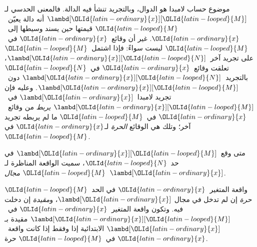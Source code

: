 \documentclass[../../../include/open-logic-section]{subfiles}
\begin{document}

موضوع حساب لامبدا هو الدوال، وبالتجريد تنشأ فيه الدالة.
فالمعنى الحدسي لـ$\lambd[\OLId{latin-ordinary}{x}][\OLId{latin-looped}{M}]$ أنه دالة يعيّن~$\OLId{latin-looped}{M}$ قيمتها حين يسند وسيطها إلى~$\OLId{latin-ordinary}{x}$.
غير أن وقائع~$\OLId{latin-ordinary}{x}$ في~$\OLId{latin-looped}{M}$ ليست سواءً: فإذا اشتمل~$\OLId{latin-looped}{M}$ على تجريد آخر~$\lambd[\OLId{latin-ordinary}{x}][\OLId{latin-looped}{N}]$،
تعلقت وقائع~$\OLId{latin-ordinary}{x}$ في~$\OLId{latin-looped}{N}$ بالتجريد~$\lambd[\OLId{latin-ordinary}{x}][\OLId{latin-looped}{N}]$ دون~$\lambd[\OLId{latin-ordinary}{x}][\OLId{latin-looped}{M}]$.
وعليه فإن تجريد لامبدا~$\lambd[\OLId{latin-ordinary}{x}]$ في~$\lambd[\OLId{latin-ordinary}{x}][\OLId{latin-looped}{M}]$ \emph{يربط}
من وقائع~$\OLId{latin-ordinary}{x}$ في~$\OLId{latin-looped}{M}$ ما لم يربطه تجريد آخر؛ وتلك هي الوقائع \emph{الحرة} لـ$\OLId{latin-ordinary}{x}$ في~$\OLId{latin-looped}{M}$.

\begin{defn}[المجال]
متى وقع~$\lambd[\OLId{latin-ordinary}{x}][\OLId{latin-looped}{M}]$ في حد~$\OLId{latin-looped}{N}$، سميت الواقعة المناظرة لـ$\OLId{latin-looped}{M}$
\emph{مجال}~$\lambd[\OLId{latin-ordinary}{x}]$.
\end{defn}

\begin{defn}
  واقعة المتغير~$\OLId{latin-ordinary}{x}$ في الحد~$\OLId{latin-looped}{M}$ \emph{حرة} إن لم تدخل في مجال
  $\lambd[\OLId{latin-ordinary}{x}]$، و\emph{مقيدة} إن دخلت فيه. وتكون واقعة المتغير~$\OLId{latin-ordinary}{x}$
  في~$\lambd[\OLId{latin-ordinary}{x}][\OLId{latin-looped}{M}]$ مقيدة بـ$\lambd[\OLId{latin-ordinary}{x}]$ الابتدائية إذا وفقط إذا كانت
  واقعة~$\OLId{latin-ordinary}{x}$ في~$\OLId{latin-looped}{M}$ حرة.
\end{defn}
\end{document}

